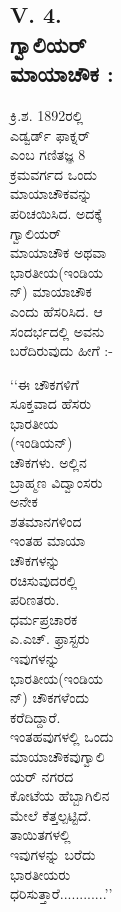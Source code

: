 \begin{figure}[H]
\begin{figure}[H]
\begin{figure}[H]
\begin{figure}[H]
\begin{figure}[H]
\subsection*{V. 4. ಗ್ವಾಲಿಯರ್ ಮಾಯಾಚೌಕ :}

ಕ್ರಿ.ಶ. 1892ರಲ್ಲಿ ಎಡ್ವರ್ಡ್ ಫಾಕ್ನರ್ ಎಂಬ ಗಣಿತಜ್ಞ 8 ಕ್ರಮವರ್ಗದ ಒಂದು ಮಾಯಾಚೌಕ\-ವನ್ನು ಪರಿಚಯಿಸಿದ. ಅದಕ್ಕೆ ಗ್ವಾಲಿಯರ್ ಮಾಯಾಚೌಕ ಅಥವಾ ಭಾರತೀಯ(ಇಂಡಿಯನ್) ಮಾಯಾಚೌಕ ಎಂದು ಹೆಸರಿಸಿದ. ಆ ಸಂದರ್ಭದಲ್ಲಿ ಅವನು ಬರೆದಿರುವುದು ಹೀಗೆ :-

‘‘ಈ ಚೌಕಗಳಿಗೆ ಸೂಕ್ತವಾದ ಹೆಸರು ಭಾರತೀಯ (ಇಂಡಿಯನ್) ಚೌಕಗಳು. ಅಲ್ಲಿನ ಬ್ರಾಹ್ಮಣ ವಿದ್ವಾಂಸರು ಅನೇಕ ಶತಮಾನಗಳಿಂದ ಇಂತಹ ಮಾಯಾ ಚೌಕಗಳನ್ನು ರಚಿಸು\-ವುದರಲ್ಲಿ ಪರಿಣತರು. ಧರ್ಮಪ್ರಚಾರಕ ಎ.ಎಚ್. ಫ್ರಾಸ್ಟರು ಇವುಗಳನ್ನು ಭಾರತೀಯ\break (ಇಂಡಿಯನ್) ಚೌಕಗಳೆಂದು ಕರೆದಿದ್ದಾರೆ. ಇಂತಹವುಗಳಲ್ಲಿ ಒಂದು ಮಾಯಾಚೌಕವು\break ಗ್ವಾಲಿಯರ್ ನಗರದ ಕೋಟೆಯ ಹೆಬ್ಬಾಗಿಲಿನ ಮೇಲೆ ಕೆತ್ತಲ್ಪಟ್ಟಿದೆ. ತಾಯಿತಗಳಲ್ಲಿ ಇವುಗಳನ್ನು\- ಬರೆದು ಭಾರತೀಯರು ಧರಿಸುತ್ತಾರೆ............’’


\end{figure}
\end{figure}
\end{figure}
\end{figure}
\end{figure}
